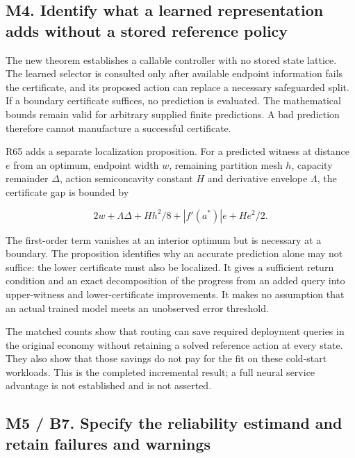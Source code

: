 \documentclass[ecta,nameyear,draft]{econsocart}
\begin{document}
\hypertarget{m4.-identify-what-a-learned-representation-adds-without-a-stored-reference-policy}{%
\subsection{M4. Identify what a learned representation adds without a
stored reference
policy}\label{m4.-identify-what-a-learned-representation-adds-without-a-stored-reference-policy}}

The new theorem establishes a callable controller with no stored state
lattice. The learned selector is consulted only after available endpoint
information fails the certificate, and its proposed action can replace a
necessary safeguarded split. If a boundary certificate suffices, no
prediction is evaluated. The mathematical bounds remain valid for
arbitrary supplied finite predictions. A bad prediction therefore cannot
manufacture a successful certificate.

R65 adds a separate localization proposition. For a predicted witness at
distance \(e\) from an optimum, endpoint width \(w\), remaining
partition mesh \(h\), capacity remainder \(\Delta\), action
semiconcavity constant \(H\) and derivative envelope \(\Lambda\), the
certificate gap is bounded by

\[
2w+\Lambda\Delta+Hh^2/8+|f'(a^*)|e+He^2/2.
\]

The first-order term vanishes at an interior optimum but is necessary at
a boundary. The proposition identifies why an accurate prediction alone
may not suffice: the lower certificate must also be localized. It gives
a sufficient return condition and an exact decomposition of the progress
from an added query into upper-witness and lower-certificate
improvements. It makes no assumption that an actual trained model meets
an unobserved error threshold.

The matched counts show that routing can save required deployment
queries in the original economy without retaining a solved reference
action at every state. They also show that those savings do not pay for
the fit on these cold-start workloads. This is the completed incremental
result; a full neural service advantage is not established and is not
asserted.

\hypertarget{m5-b7.-specify-the-reliability-estimand-and-retain-failures-and-warnings}{%
\subsection{M5 / B7. Specify the reliability estimand and retain
failures and
warnings}\label{m5-b7.-specify-the-reliability-estimand-and-retain-failures-and-warnings}}
\end{document}
